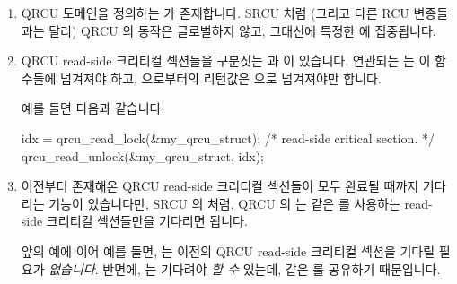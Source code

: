 \begin{enumerate}
\item	QRCU 도메인을 정의하는  가 존재합니다.
	SRCU 처럼 (그리고 다른 RCU 변종들과는 달리) QRCU 의 동작은 글로벌하지
	않고, 그대신에 특정한  에 집중됩니다.
\item	QRCU read-side 크리티컬 섹션들을 구분짓는  과
	 이 있습니다.
	연관되는  는 이 함수들에 넘겨져야 하고,
	 으로부터의 리턴값은  으로
	넘겨져야만 합니다.

	예를 들면 다음과 같습니다:
\iffalse

\item	There is a \co{qrcu_struct} that defines a QRCU domain.
	Like SRCU (and unlike other variants of RCU) QRCU's action
	is not global, but instead focused on the specified
	\co{qrcu_struct}.
\item	There are \co{qrcu_read_lock()} and \co{qrcu_read_unlock()}
	primitives that delimit QRCU read-side critical sections.
	The corresponding \co{qrcu_struct} must be passed into
	these primitives, and the return value from \co{qrcu_read_lock()}
	must be passed to \co{qrcu_read_unlock()}.

	For example:
\fi

\begin{VerbatimU}
idx = qrcu_read_lock(&my_qrcu_struct);
/* read-side critical section. */
qrcu_read_unlock(&my_qrcu_struct, idx);
\end{VerbatimU}

\item	이전부터 존재해온 QRCU read-side 크리티컬 섹션들이 모두 완료될 때까지
	기다리는  기능이 있습니다만, SRCU 의
	 처럼, QRCU 의  는 같은
	 를 사용하는 read-side 크리티컬 섹션들만을 기다리면
	됩니다.

	앞의 예에 이어 예를 들면,  는
	이전의 QRCU read-side 크리티컬 섹션을 기다릴 필요가 \emph{없습니다}.
	반면에,  는 기다려야 \emph{할 수}
	있는데, 같은  를 공유하기 때문입니다.
\iffalse

\item	There is a \co{synchronize_qrcu()} primitive that blocks until
	all pre-existing QRCU read-side critical sections complete,
	but, like SRCU's \co{synchronize_srcu()}, QRCU's
	\co{synchronize_qrcu()} need wait only for those read-side
	critical sections that are using the same \co{qrcu_struct}.

	For example, \co{synchronize_qrcu(&your_qrcu_struct)}
	would \emph{not} need to wait on the earlier QRCU read-side
	critical section.
	In contrast, \co{synchronize_qrcu(&my_qrcu_struct)}
	\emph{would} need to wait, since it shares the same
	\co{qrcu_struct}.
\fi
\end{enumerate}

